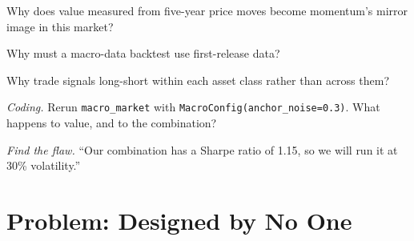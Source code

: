 \begin{exercise}[$\star\star$]\label{exo:s2:systematic-macro:4}
Why does value measured from five-year price moves become momentum's mirror image in this market?
\end{exercise}

\begin{exercise}[$\star\star$]\label{exo:s2:systematic-macro:5}
Why must a macro-data backtest use first-release data?
\end{exercise}

\begin{exercise}[$\star\star$]\label{exo:s2:systematic-macro:6}
Why trade signals long-short within each asset class rather than across them?
\end{exercise}

\begin{exercise}[$\star\star\star$]\label{exo:s2:systematic-macro:7}
\emph{Coding.} Rerun \texttt{macro\_market} with \texttt{MacroConfig(anchor\_noise=0.3)}. What happens to value, and to the combination?
\end{exercise}

\begin{exercise}[$\star\star\star$]\label{exo:s2:systematic-macro:8}
\emph{Find the flaw.} ``Our combination has a Sharpe ratio of 1.15, so we will run it at 30\% volatility.''
\end{exercise}

\section{Problem: Designed by No One}

